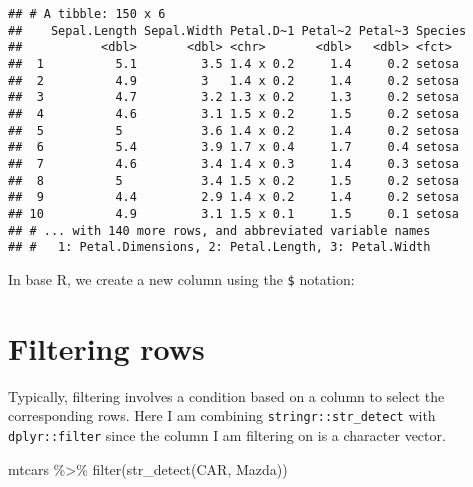 \documentclass[
]{book}
\newenvironment{Shaded}{\begin{snugshade}}{\end{snugshade}}
\newcommand{\AttributeTok}[1]{\textcolor[rgb]{0.77,0.63,0.00}{#1}}
\newcommand{\CommentTok}[1]{\textcolor[rgb]{0.56,0.35,0.01}{\textit{#1}}}
\newcommand{\FunctionTok}[1]{\textcolor[rgb]{0.00,0.00,0.00}{#1}}
\newcommand{\NormalTok}[1]{#1}
\newcommand{\OtherTok}[1]{\textcolor[rgb]{0.56,0.35,0.01}{#1}}
\newcommand{\SpecialCharTok}[1]{\textcolor[rgb]{0.00,0.00,0.00}{#1}}
\newcommand{\StringTok}[1]{\textcolor[rgb]{0.31,0.60,0.02}{#1}}
\begin{document}
\begin{verbatim}
## # A tibble: 150 x 6
##    Sepal.Length Sepal.Width Petal.D~1 Petal~2 Petal~3 Species
##           <dbl>       <dbl> <chr>       <dbl>   <dbl> <fct>  
##  1          5.1         3.5 1.4 x 0.2     1.4     0.2 setosa 
##  2          4.9         3   1.4 x 0.2     1.4     0.2 setosa 
##  3          4.7         3.2 1.3 x 0.2     1.3     0.2 setosa 
##  4          4.6         3.1 1.5 x 0.2     1.5     0.2 setosa 
##  5          5           3.6 1.4 x 0.2     1.4     0.2 setosa 
##  6          5.4         3.9 1.7 x 0.4     1.7     0.4 setosa 
##  7          4.6         3.4 1.4 x 0.3     1.4     0.3 setosa 
##  8          5           3.4 1.5 x 0.2     1.5     0.2 setosa 
##  9          4.4         2.9 1.4 x 0.2     1.4     0.2 setosa 
## 10          4.9         3.1 1.5 x 0.1     1.5     0.1 setosa 
## # ... with 140 more rows, and abbreviated variable names
## #   1: Petal.Dimensions, 2: Petal.Length, 3: Petal.Width
\end{verbatim}

In base R, we create a new column using the \texttt{\$} notation:

\begin{Shaded}
\end{Shaded}

\hypertarget{filtering-rows}{%
\section{Filtering rows}\label{filtering-rows}}

Typically, filtering involves a condition based on a column to select the corresponding rows. Here I am combining \texttt{stringr::str\_detect} with \texttt{dplyr::filter} since the column I am filtering on is a character vector.

\begin{Shaded}
\begin{Highlighting}[]
\NormalTok{mtcars }\SpecialCharTok{\%\textgreater{}\%} \FunctionTok{filter}\NormalTok{(}\FunctionTok{str\_detect}\NormalTok{(CAR, }\StringTok{\textquotesingle{}Mazda\textquotesingle{}}\NormalTok{))}
\end{Highlighting}
\end{Shaded}
\end{document}

